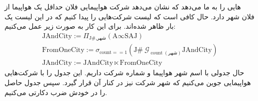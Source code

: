\begin{enumerate}
    هایی
    را به ما می‌دهد که نشان می‌دهد شرکت هواپیمایی فلان حداقل یک هواپیما از فلان شهر دارد.
    حال کافی است که لیست شرکت‌هایی را پیدا کنیم که در این لیست یک بار ظاهر شده‌اند.
    برای این کار به صورت زیر عمل می‌کنیم:
    \begin{gather*}
        \text{JAndCity} := \Pi_{\text{J\#}, \text{شهر}} (\text{A} \infty \text{SAJ})\\
        \text{FromOneCity} := \sigma_{\text{count} == 1} (\text{J\#} ~ \mathcal{G}_{\operatorname{count}(\text{شهر})} \text{JAndCity})\\
        \text{JAndCity} := \text{JAndCity} \ltimes \text{FromOneCity}
    \end{gather*}
    حال جدولی با اسم شهر هواپیما و شماره شرکت داریم. این جدول را با شرکت‌هایی هواپیمایی جوین می‌کنیم که شهر
    شرکت نیز در کنار آن قرار گیرد. سپس جدول حاصل را در خودش ضرب دکارتی می‌کنیم.
\end{enumerate}